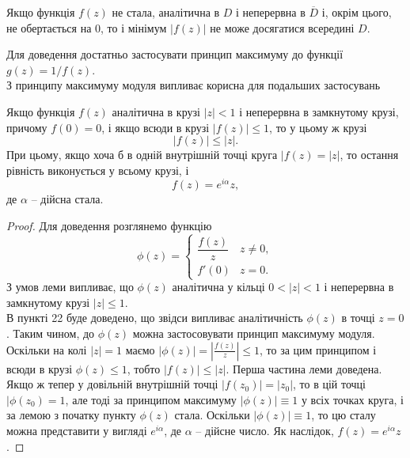 \begin{remark*}
	Якщо функція $f(z)$ не стала, аналітична в $D$ і неперервна в $\overline{D}$ і, окрім цього, не обертається на 0, то і мінімум $|f(z)|$ не може досягатися всередині $D$.
\end{remark*}
Для доведення достатньо застосувати принцип максимуму до функції $g(z) = 1 / f(z)$. \\

З принципу максимуму модуля випливає корисна для подальших застосувань
\begin{lemma}[Г. Шварц]
	Якщо функція $f(z)$ аналітична в крузі $|z| < 1$ і неперервна в замкнутому крузі, причому $f(0) = 0$, і якщо всюди в крузі $|f(z)| \le 1$, то у цьому ж крузі
	\begin{equation}
		\label{eq:4.5.8}
		|f(z)| \le |z|.
	\end{equation}
	При цьому, якщо хоча б в одній внутрішній точці круга $|f(z) = |z|$, то остання рівність виконується у всьому крузі, і
	\begin{equation}
		\label{eq:4.5.9}
		f(z) = e^{i \alpha} z,
	\end{equation}
	де $\alpha$ -- дійсна стала.
\end{lemma}

\begin{proof}
Для доведення розглянемо функцію
\begin{equation}
	\label{eq:4.5.10}
	\phi(z) = \begin{cases} \dfrac{f(z)}{z} & z \ne 0, \\ f'(0) & z = 0. \end{cases}
\end{equation}
З умов леми випливає, що $\phi(z)$ аналітична у кільці $0 < |z| < 1$ і неперервна в замкнутому крузі $|z| \le 1$. \\

В пункті 22 буде доведено, що звідси випливає аналітичність $\phi(z)$ в точці $z = 0$. Таким чином, до $\phi(z)$ можна застосовувати принцип максимуму модуля. Оскільки на колі $|z| = 1$ маємо $|\phi(z)| = \left| \frac{f(z)}{z} \right| \le 1$, то за цим принципом і всюди в крузі $\phi(z) \le 1$, тобто $|f(z)| \le |z|$. Перша частина леми доведена. \\

Якщо ж тепер у довільній внутрішній точці $|f(z_0)| = |z_0|$, то в цій точці $|\phi(z_0) = 1$, але тоді за принципом максимуму $|\phi(z)| \equiv 1$ у всіх точках круга, і за лемою з початку пункту $\phi(z)$ стала. Оскільки $|\phi(z)| \equiv 1$, то цю сталу можна представити у вигляді $e^{i \alpha}$, де $\alpha$ -- дійсне число. Як наслідок, $f(z) = e^{i \alpha} z$.
\end{proof}

